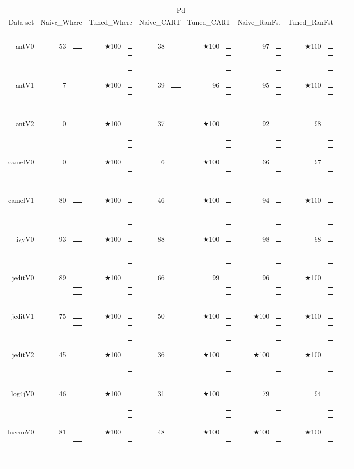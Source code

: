 \documentclass{acm_proc_article-sp}
\newcommand{\crule}[3][darkgray]{\textcolor{#1}{\rule{#2}{#3}}}
\newcommand{\rone}{\crule{1mm}{1.95mm}}
\newcommand{\rtwo}{\crule{1mm}{1.95mm}\hspace{0.3pt}\crule{1mm}{1.95mm}}
\newcommand{\rthree}{\crule{1mm}{1.95mm}\hspace{0.3pt}\crule{1mm}{1.95mm}\hspace{0.3pt}\crule{1mm}{1.95mm}}
\newcommand{\rfour}{\crule{1mm}{1.95mm}\hspace{0.3pt}\crule{1mm}{1.95mm}\hspace{0.3pt}\crule{1mm}{1.95mm}\hspace{0.3pt}\crule{1mm}{1.95mm}}
\begin{document}
\begin{figure*}
\renewcommand{\baselinestretch}{0.5} 
\scriptsize
\begin{minipage}{0.81\linewidth}
\begin{tabular}{r@{~}|r@{~}l@{~}|r@{~}l@{~}|r@{~}l|r@{~}@{~}l|r@{~}l@{~}|r@{~}l@{~}|r@{~}l}
  \multicolumn{1}{c|}{~}&\multicolumn{11}{c}{Pd } \\
  Data set   &   \multicolumn{2}{c}{Naive\_Where}         &   \multicolumn{2}{c}{Tuned\_Where}         &   \multicolumn{2}{c}{Naive\_CART}         &   \multicolumn{2}{c}{Tuned\_CART}    &   \multicolumn{2}{c}{Naive\_RanFst}  &   \multicolumn{2}{c}{Tuned\_RanFst}\\\hline
\multicolumn{1}{c}{~}\\
antV0 & 53 & {\rone} & $\bigstar$100 & {\rfour} & 38 &         & $\bigstar$100 & {\rfour} & 97 & {\rfour} & $\bigstar$100 & {\rfour}\\
antV1 & 7 &         & $\bigstar$100 & {\rfour} & 39 & {\rone} & 96 & {\rfour} & 95 & {\rfour} & $\bigstar$100 & {\rfour}\\
antV2 & 0 &         & $\bigstar$100 & {\rfour} & 37 & {\rone} & $\bigstar$100 & {\rfour} & 92 & {\rfour} & 98 & {\rfour}\\
camelV0 & 0 &         & $\bigstar$100 & {\rfour} & 6 &         & $\bigstar$100 & {\rfour} & 66 & {\rthree} & 97 & {\rfour}\\
camelV1 & 80 & {\rthree} & $\bigstar$100 & {\rfour} & 46 &         & $\bigstar$100 & {\rfour} & 94 & {\rfour} & $\bigstar$100 & {\rfour}\\
ivyV0 & 93 & {\rtwo} & $\bigstar$100 & {\rfour} & 88 &         & $\bigstar$100 & {\rfour} & 98 & {\rfour} & 98 & {\rfour}\\
jeditV0 & 89 & {\rthree} & $\bigstar$100 & {\rfour} & 66 &         & 99 & {\rfour} & 96 & {\rfour} & $\bigstar$100 & {\rfour}\\
jeditV1 & 75 & {\rtwo} & $\bigstar$100 & {\rfour} & 50 &         & $\bigstar$100 & {\rfour} & $\bigstar$100 & {\rfour} & $\bigstar$100 & {\rfour}\\
jeditV2 & 45 &         & $\bigstar$100 & {\rfour} & 36 &         & $\bigstar$100 & {\rfour} & $\bigstar$100 & {\rfour} & $\bigstar$100 & {\rfour}\\
log4jV0 & 46 & {\rone} & $\bigstar$100 & {\rfour} & 31 &         & $\bigstar$100 & {\rfour} & 79 & {\rthree} & 94 & {\rfour}\\
luceneV0 & 81 & {\rthree} & $\bigstar$100 & {\rfour} & 48 &         & $\bigstar$100 & {\rfour} & $\bigstar$100 & {\rfour} & $\bigstar$100 & {\rfour}\\

\end{tabular}
\end{minipage}
\end{figure*}
\end{document}
